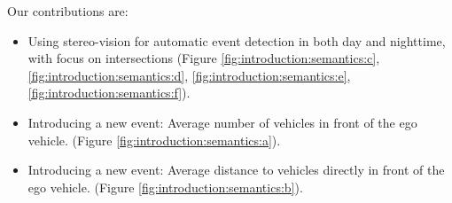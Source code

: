 \vspace*{-3mm}
Our contributions are:
\begin{itemize}
\item Using stereo-vision for automatic event detection in both day and nighttime, with focus on intersections (Figure \ref{fig:introduction:semantics:c}, \ref{fig:introduction:semantics:d}, \ref{fig:introduction:semantics:e}, \ref{fig:introduction:semantics:f}).
\item Introducing a new event: Average number of vehicles in front of the ego vehicle. (Figure \ref{fig:introduction:semantics:a}).
\item Introducing a new event: Average distance to vehicles directly in front of the ego vehicle. (Figure \ref{fig:introduction:semantics:b}).
\end{itemize}

